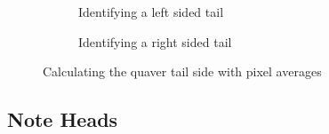 \begin{figure}[h!]
    \centering

    \begin{subfigure}[b]{.45\linewidth}
        \centering
      \caption{Identifying a left sided tail}
      \label{fig:quaver-tail-average-position-left}
    \end{subfigure}
    \begin{subfigure}[b]{.45\linewidth}
        \centering
      \caption{Identifying a right sided tail}
      \label{fig:quaver-tail-average-position-right}
    \end{subfigure}

      \caption{Calculating the quaver tail side with pixel averages}
      \label{fig:quaver-tail-average-position}
\end{figure}

\subsection{Note Heads}


